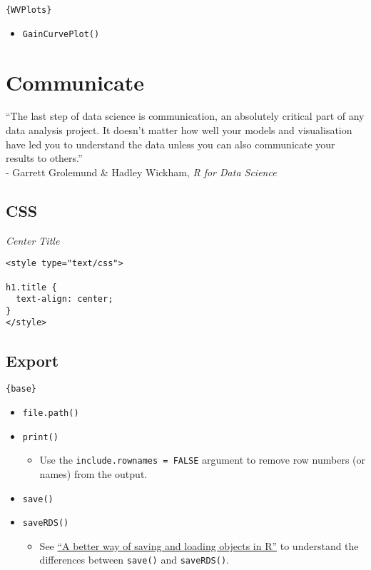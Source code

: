 \documentclass[
]{book}
\providecommand{\tightlist}{%
  \setlength{\itemsep}{0pt}\setlength{\parskip}{0pt}}
\begin{document}
\texttt{\{WVPlots\}}

\begin{itemize}
\tightlist
\item
  \texttt{GainCurvePlot()}
\end{itemize}

\hypertarget{communicate}{%
\chapter{Communicate}\label{communicate}}

``The last step of data science is communication, an absolutely critical part of any data analysis project. It doesn't matter how well your models and visualisation have led you to understand the data unless you can also communicate your results to others.''\\
- Garrett Grolemund \& Hadley Wickham, \emph{R for Data Science}

\hypertarget{css}{%
\section{CSS}\label{css}}

\emph{Center Title}

\begin{verbatim}
<style type="text/css">

h1.title {
  text-align: center;
}
</style>
\end{verbatim}

\hypertarget{export}{%
\section{Export}\label{export}}

\texttt{\{base\}}

\begin{itemize}
\tightlist
\item
  \texttt{file.path()}
\item
  \texttt{print()}

  \begin{itemize}
  \tightlist
  \item
    Use the \texttt{include.rownames\ =\ FALSE} argument to remove row numbers (or names) from the output.
  \end{itemize}
\item
  \texttt{save()}
\item
  \texttt{saveRDS()}

  \begin{itemize}
  \tightlist
  \item
    See \href{https://www.fromthebottomoftheheap.net/2012/04/01/saving-and-loading-r-objects/}{``A better way of saving and loading objects in R''} to understand the differences between \texttt{save()} and \texttt{saveRDS()}.
  \end{itemize}
\end{itemize}
\end{document}

